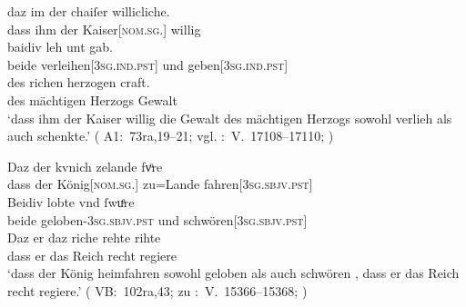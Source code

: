 \begin{exe}
\ex \label{ex:konjadjvvbeidiu}
	\begin{xlist}
	\ex \label{ex:konjadjvvbeidiu_1} %
		\gll daz im der chaiſer willicliche. \\
			dass ihm der Kaiser[\textsc{nom.sg.\MascM}] willig \\
	\sn \gll baidiv leh unt gab. \\
			beide verleihen[\textsc{3sg\subM.ind.pst}] und
			geben[\textsc{3sg\subM.ind.pst}] \\
	\sn \gll des richen herzogen craft. \\
			des mächtigen Herzogs Gewalt \\
		\trans `dass ihm der Kaiser willig die Gewalt des mächtigen Herzogs sowohl verlieh als auch schenkte.'
			(%
				A1:~73ra,19--21; vgl.
				\KC:~V.~17108--17110;
				\cite[389]{schroeder1895}%
			)

	\ex \label{ex:konjadjvvbeidiu_2} %
		\gll Daz der kvnich zelande fvͦre \\
			dass der König[\textsc{nom.sg.\MascM}] zu=Lande
			fahren[\textsc{3sg\subM.sbjv.pst}] \\
	\sn \gll Beidiv lobte vnd ſwuͤre \\
			beide geloben-\textsc{3sg\subM.sbjv.pst} und
			schwören[\textsc{3sg\subM.sbjv.pst}] \\
	\sn \gll Daz er daz riche rehte rihte \\
			dass er das Reich recht regiere \\
		\trans `dass der König heimfahren  sowohl geloben als
			auch schwören , dass er das Reich recht regiere.'
			(%
				VB:~102ra,43; zu
				\KC:~V.~15366--15368;
				\cite[359]{schroeder1895}%
			)



\end{xlist}
\end{exe}
